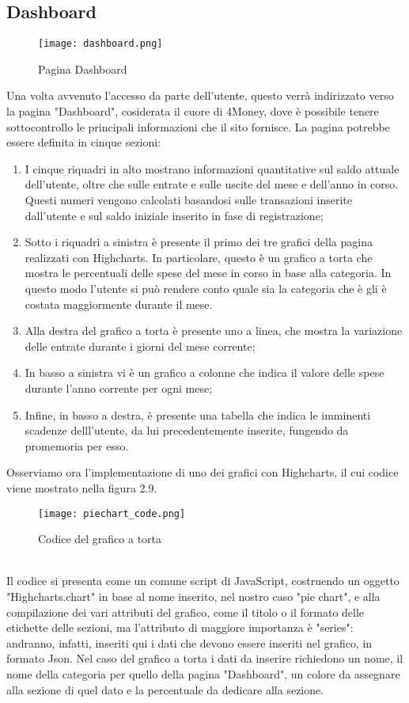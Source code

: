 \documentclass[binding=0.6cm, oneside, noexaminfo, italian]{sapthesis}
\begin{document}
\subsection{Dashboard}
\begin{figure}[h]
    \centering
    \texttt{[image: dashboard.png]}
    \caption{Pagina Dashboard}
    \label{fig:dashboard}
\end{figure}
Una volta avvenuto l'accesso da parte dell'utente, questo verrà indirizzato verso la pagina "Dashboard", cosiderata il cuore di 4Money, dove è possibile tenere sottocontrollo le principali informazioni che il sito fornisce. La pagina potrebbe essere definita in cinque sezioni:
\begin{enumerate}
    \item I cinque riquadri in alto mostrano informazioni quantitative sul saldo attuale dell'utente, oltre che sulle entrate e sulle uscite del mese e dell'anno in corso. Questi numeri vengono calcolati basandosi sulle transazioni inserite dall'utente e sul saldo iniziale inserito in fase di registrazione;
    \item Sotto i riquadri a sinistra è presente il primo dei tre grafici della pagina realizzati con Highcharts. In particolare, questo è un grafico a torta che mostra le percentuali delle spese del mese in corso in base alla categoria. In questo modo l'utente si può rendere conto quale sia la categoria che è gli è costata maggiormente durante il mese.
    \item Alla destra del grafico a torta è presente uno a linea, che mostra la variazione delle entrate durante i giorni del mese corrente;
    \item In basso a sinistra vi è un grafico a colonne che indica il valore delle spese durante l'anno corrente per ogni mese;
    \item Infine, in basso a destra, è presente una tabella che indica le imminenti scadenze delll'utente, da lui precedentemente inserite, fungendo da promemoria per esso.
\end{enumerate}
Osserviamo ora l'implementazione di uno dei grafici con Highcharts, il cui codice viene mostrato nella figura 2.9. \\
\begin{figure}[h]
    \centering
    \texttt{[image: piechart\_code.png]}
    \caption{Codice del grafico a torta}
    \label{fig:piechart_code}
\end{figure} \\
Il codice si presenta come un comune script di JavaScript, costruendo un oggetto "Highcharts.chart" in base al nome inserito, nel nostro caso "pie chart", e alla compilazione dei vari attributi del grafico, come il titolo o il formato delle etichette delle sezioni, ma l'attributo di maggiore importanza è "series": andranno, infatti, inseriti qui i dati che devono essere inseriti nel grafico, in formato Json. Nel caso del grafico a torta i dati da inserire richiedono un nome, il nome della categoria per quello della pagina "Dashboard", un colore da assegnare alla sezione di quel dato e la percentuale da dedicare alla sezione. \\
\end{document}
